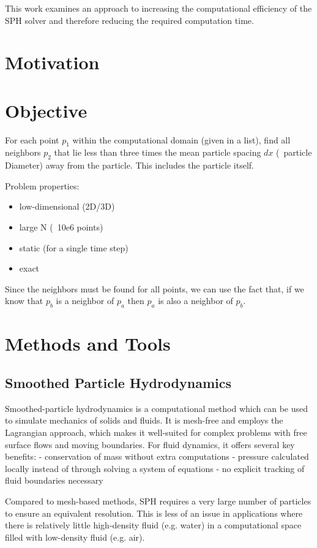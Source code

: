 This work examines an approach to increasing the computational efficiency of the SPH solver and therefore reducing the required computation time. 

\chapter{Motivation}

\chapter{Objective}

For each point $p_1$ within the computational domain (given in a list), find all neighbors $p_2$ that lie less than three times the mean particle spacing $dx$ (~particle Diameter) away from the particle. This includes the particle itself. 

Problem properties:

\begin{itemize}
\item low-dimensional (2D/3D)
\item large N (~10e6 points)
\item static (for a single time step)
\item  exact
\end{itemize}

Since the neighbors must be found for all points, we can use the fact that, if we know that $p_b$ is a neighbor of $p_a$ then $p_a$ is also a neighbor of $p_b$.   

\chapter{Methods and Tools}

\section{Smoothed Particle Hydrodynamics}
Smoothed-particle hydrodynamics is a computational method which can be used to simulate mechanics of solids and fluids. It is mesh-free and employs the Lagrangian approach, which makes it well-suited for complex problems with free surface flows and moving boundaries. For fluid dynamics, it offers several key benefits:
- conservation of mass without extra computations
- pressure calculated locally instead of through solving a system of equations
- no explicit tracking of fluid boundaries necessary

Compared to mesh-based methods, SPH requires a very large number of particles to ensure an equivalent resolution. This is less of an issue in applications where there is relatively little high-density fluid (e.g. water) in a computational space filled with low-density fluid (e.g. air).

